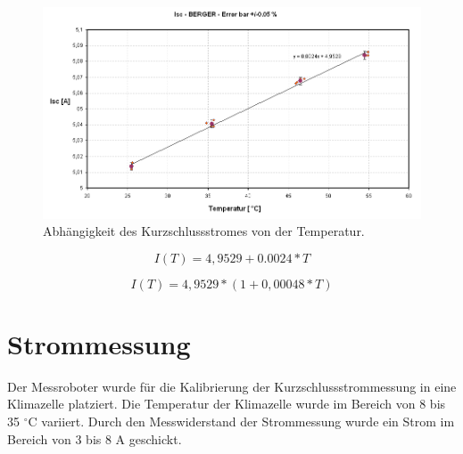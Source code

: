 \documentclass[a4paper,bibtotoc,oneside]{scrbook}
\begin{document}
\begin{figure}[htbp]
\centering
\includegraphics[width=150mm]{img/tempkoef.png}
\caption{Abhängigkeit des Kurzschlussstromes von der Temperatur.}\label{tempkoef}
\end{figure}

  \begin{equation}
     I(T) = 4,9529+0.0024 \ast T
  \end{equation}
  
    \begin{equation}
     I(T) = 4,9529 \ast ( 1 + 0,00048 \ast T)
  \end{equation}

\section{Strommessung}\thispagestyle{empty}

Der Messroboter wurde für die Kalibrierung der Kurzschlussstrommessung in eine Klimazelle platziert.  Die Temperatur der Klimazelle wurde im Bereich von 8 bis 35 $^{\circ}$C variiert. Durch den Messwiderstand der Strommessung wurde ein Strom im Bereich von 3 bis 8 A geschickt.  
\end{document}
